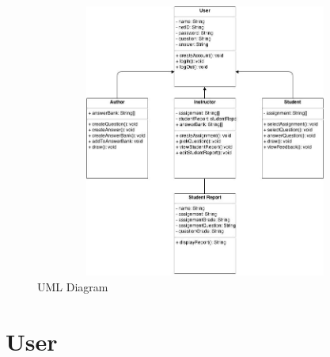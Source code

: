     \begin{figure}[H]
            \centerline{\includegraphics[height=9cm, width=12cm]{UML_1.jpg}}
            \caption{UML Diagram}
    \end{figure}









\chapter{User}

